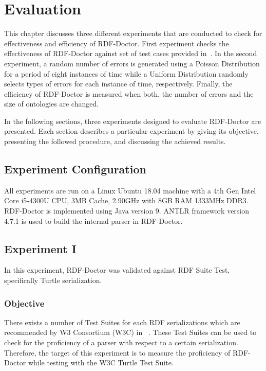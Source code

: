 \chapter{Evaluation}
\label{ch:evaluation}

This chapter discusses three different experiments that are conducted to check for effectiveness and efficiency of RDF-Doctor.
First experiment checks the effectiveness of RDF-Doctor against set of test cases provided in~\cite{TurtleTests:Online}.
In the second experiment, a random number of errors is generated using a Poisson Distribution for a period of eight instances of time while a Uniform Distribution randomly selects types of errors for each instance of time, respectively.
Finally, the efficiency of RDF-Doctor is measured when both, the number of errors and the size of ontologies are changed. 

In the following sections, three experiments designed to evaluate RDF-Doctor are presented. 
Each section describes a particular experiment by giving its objective, presenting the followed procedure, and discussing the achieved results.

\section{Experiment Configuration}

All experiments are run on a Linux Ubuntu 18.04 machine with a 4th Gen Intel Core i5-4300U CPU, 3MB Cache, 2.90GHz with 8GB RAM 1333MHz DDR3. 
RDF-Doctor is implemented using Java version 9. 
ANTLR framework version 4.7.1 is used to build the internal parser in RDF-Doctor.%

\section{Experiment I} 
In this experiment, RDF-Doctor was validated against RDF Suite Test, specifically Turtle serialization. 

\subsection{Objective}

There exists a number of Test Suites for each RDF serializations which are recommended by W3 Consortium (W3C) in ~\cite{TurtleTests:Online}.
These Test Suites can be used to check for the proficiency of a parser with respect to a certain serialization.%
Therefore, the target of this experiment is to measure the proficiency of RDF-Doctor while testing with the W3C Turtle Test Suite.

